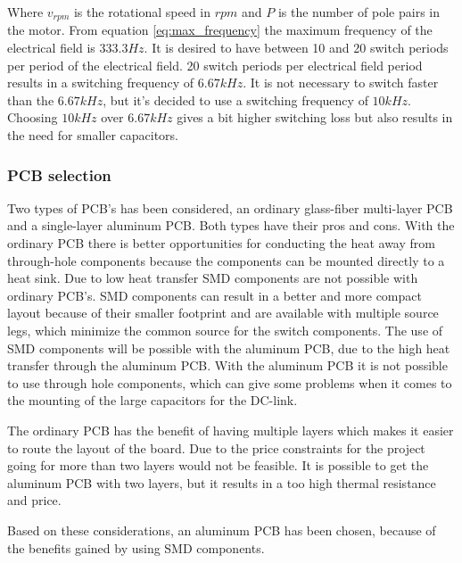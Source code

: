 Where $v_{rpm}$ is the rotational speed in $rpm$ and $P$ is the number of pole pairs in the motor.
From equation \ref{eq:max_frequency} the maximum frequency of the electrical field is $333.3 Hz$.
It is desired to have between 10 and 20 switch periods per period of the electrical field. 20 switch periods per electrical field period results in a switching frequency of $6.67kHz$. It is not necessary to switch faster than the $6.67 kHz$, but it's decided to use a switching frequency of $10 kHz$. Choosing $10kHz$ over $6.67 kHz$ gives a bit higher switching loss but also results in the need for smaller capacitors. 



\subsubsection{PCB selection}   \label{PCB_selection}
Two types of PCB's has been considered, an ordinary glass-fiber multi-layer PCB and a single-layer aluminum PCB. Both types have their pros and cons. With the ordinary PCB there is better opportunities for conducting the heat away from through-hole components because the components can be mounted directly to a heat sink. Due to low heat transfer SMD components are not possible with ordinary PCB's.
SMD components can result in a better and more compact layout because of their smaller footprint and are available with multiple source legs, which minimize the common source for the switch components. 
The use of SMD components will be possible with the aluminum PCB, due to the high heat transfer through the aluminum PCB.
With the aluminum PCB it is not possible to use through hole components, which can give some problems when it comes to the mounting of the large capacitors for the DC-link. 

The ordinary PCB has the benefit of having multiple layers which makes it easier to route the layout of the board. Due to the price constraints for the project going for more than two layers would not be feasible. It is possible to get the aluminum PCB with two layers, but it results in a too high thermal resistance and price.


Based on these considerations, an aluminum PCB has been chosen,
because of the benefits gained by using SMD components.



